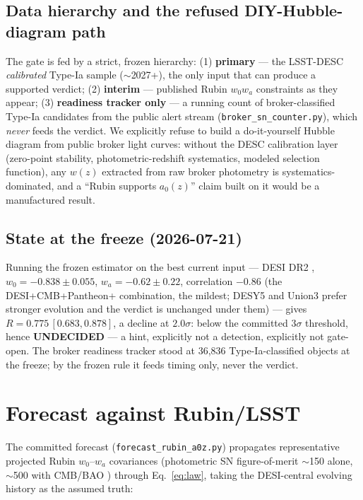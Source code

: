 \documentclass[11pt,a4paper]{article}
\newcommand{\azero}{a_0}
\begin{document}
\subsection{Data hierarchy and the refused DIY-Hubble-diagram path}

The gate is fed by a strict, frozen hierarchy: (1) \textbf{primary} --- the
LSST-DESC \emph{calibrated} Type-Ia sample ($\sim$2027+), the only input that
can produce a supported verdict; (2) \textbf{interim} --- published Rubin
$w_0w_a$ constraints as they appear; (3) \textbf{readiness tracker only} ---
a running count of broker-classified Type-Ia candidates from the public alert
stream (\texttt{broker\_sn\_counter.py}), which \emph{never} feeds the
verdict. We explicitly refuse to build a do-it-yourself Hubble diagram from
public broker light curves: without the DESC calibration layer (zero-point
stability, photometric-redshift systematics, modeled selection function), any
$w(z)$ extracted from raw broker photometry is systematics-dominated, and a
``Rubin supports $\azero(z)$'' claim built on it would be a manufactured
result.

\subsection{State at the freeze (2026-07-21)}

Running the frozen estimator on the best current input --- DESI DR2
\cite{DESI2025}, $w_0=-0.838\pm0.055$, $w_a=-0.62\pm0.22$, correlation
$-0.86$ (the DESI+CMB+Pantheon+ combination, the mildest; DESY5 and Union3
prefer stronger evolution and the verdict is unchanged under them) --- gives
$R=0.775\,[0.683,0.878]$, a decline at $2.0\sigma$: below the committed
$3\sigma$ threshold, hence \textbf{UNDECIDED} --- a hint, explicitly not a
detection, explicitly not gate-open. The broker readiness tracker stood at
36,836 Type-Ia-classified objects at the freeze; by the frozen rule it feeds
timing only, never the verdict.

\section{Forecast against Rubin/LSST}
\label{sec:forecast}

The committed forecast (\texttt{forecast\_rubin\_a0z.py}) propagates
representative projected Rubin $w_0$--$w_a$ covariances (photometric SN
figure-of-merit $\sim$150 alone, $\sim$500 with CMB/BAO \cite{DESC,Ivezic2019})
through Eq.~\eqref{eq:law}, taking the DESI-central evolving history as the
assumed truth:
\end{document}
